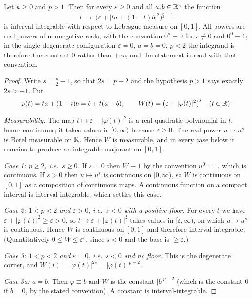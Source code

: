 \begin{helper}
Let $n\ge0$ and $p>1$.  Then for every $\varepsilon\ge0$ and all
$a,b\in\mathbb{R}^n$ the function
\[
t\ \longmapsto\ \bigl(\varepsilon+|ta+(1-t)b|^2\bigr)^{\frac p2-1}
\]
is interval-integrable with respect to Lebesgue measure on $[0,1]$.
All powers are real powers of nonnegative reals, with the convention
$0^{s}=0$ for $s\ne0$ and $0^{0}=1$; in the single degenerate configuration
$\varepsilon=0$, $a=b=0$, $p<2$ the integrand is therefore the constant $0$
rather than $+\infty$, and the statement is read with that convention.
\end{helper}
\begin{proof}
Write $s=\frac p2-1$, so that $2s=p-2$ and the hypothesis $p>1$ says exactly
$2s>-1$.  Put
\[
\varphi(t)=ta+(1-t)b=b+t(a-b),\qquad
W(t)=\bigl(\varepsilon+|\varphi(t)|^2\bigr)^{s}\quad(t\in\mathbb{R}).
\]

\emph{Measurability.}  The map $t\mapsto\varepsilon+|\varphi(t)|^2$ is a real
quadratic polynomial in $t$, hence continuous; it takes values in
$[0,\infty)$ because $\varepsilon\ge0$.  The real power $u\mapsto u^{s}$ is
Borel measurable on $\mathbb{R}$.  Hence $W$ is measurable, and in every case below it
remains to produce an integrable majorant on $[0,1]$.

\emph{Case 1: $p\ge2$, i.e.\ $s\ge0$.}  If $s=0$ then $W\equiv1$ by the
convention $u^{0}=1$, which is continuous.  If $s>0$ then $u\mapsto u^{s}$ is
continuous on $[0,\infty)$, so $W$ is continuous on $[0,1]$ as a composition of
continuous maps.  A continuous function on a compact interval is
interval-integrable, which settles this case.

\emph{Case 2: $1<p<2$ and $\varepsilon>0$, i.e.\ $s<0$ with a positive floor.}
For every $t$ we have $\varepsilon+|\varphi(t)|^2\ge\varepsilon>0$, so
$t\mapsto\varepsilon+|\varphi(t)|^2$ takes values in $[\varepsilon,\infty)$,
on which $u\mapsto u^{s}$ is continuous.  Hence $W$ is continuous on $[0,1]$
and therefore interval-integrable.  (Quantitatively $0\le W\le\varepsilon^{s}$,
since $s<0$ and the base is $\ge\varepsilon$.)

\emph{Case 3: $1<p<2$ and $\varepsilon=0$, i.e.\ $s<0$ and no floor.}  This is
the degenerate corner, and $W(t)=|\varphi(t)|^{2s}=|\varphi(t)|^{p-2}$.

\emph{Case 3a: $a=b$.}  Then $\varphi\equiv b$ and $W$ is the constant
$|b|^{p-2}$ (which is the constant $0$ if $b=0$, by the stated convention).  A
constant is interval-integrable.


\end{proof}
